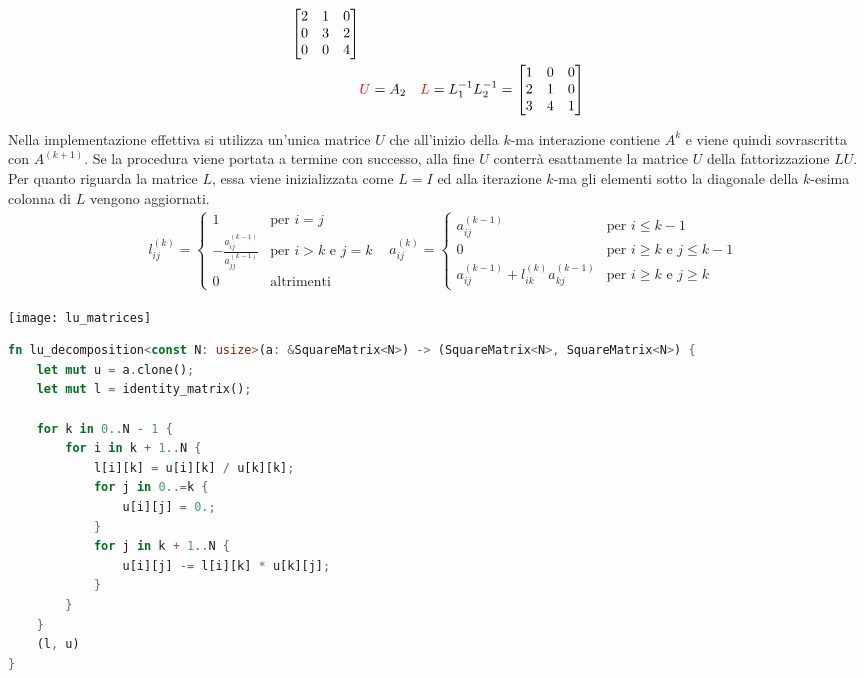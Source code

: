 \documentclass{article}
\begin{document}
\begin{example}
\begin{equation*}
\begin{aligned}
\begin{bmatrix}
               2 & 1 & 0 \\ 
               0 & 3 & 2 \\ 
               0 & 0 & 4
           \end{bmatrix}\\
           & {\color{red}U}=A_2 & {\color{red}L}=L_{1}^{-1}L_{2}^{-1}=\begin{bmatrix}
               1 & 0 & 0 \\ 
               2 & 1 & 0 \\ 
               3 & 4 & 1
           \end{bmatrix}
       \end{aligned} 
    \end{equation*}
\end{example}

Nella implementazione effettiva si utilizza un'unica matrice $U$ che
all'inizio della $k$-ma interazione contiene $A^{k}$ e viene quindi
sovrascritta con $A^{(k+1)}$. Se la procedura viene portata a termine con
successo, alla fine $U$ conterrà esattamente la matrice $U$ della
fattorizzazione $LU$. Per quanto riguarda la matrice $L$, essa viene
inizializzata come $L=I$ ed alla iterazione $k$-ma gli elementi sotto la
diagonale della $k$-esima colonna di $L$ vengono aggiornati.
\begin{equation*}
   \begin{aligned}
       & l_{ij}^{(k)}=\begin{cases}
           1 & \text{per }i=j\\ 
           -\frac{a_{ij}^{(k-1)}}{a_{jj}^{(k-1)}} & \text{per }i>k \text{ e }
           j=k \\ 
           0 & \text{altrimenti}
       \end{cases}
       & a_{ij}^{(k)}=\begin{cases}
           a_{ij}^{(k-1)} & \text{per }i\leq k-1 \\
           0 & \text{per }i\geq k \text{ e }j\leq k-1 \\ 
           a_{ij}^{(k-1)}+l_{ik}^{(k)}a_{kj}^{(k-1)} & \text{per }i\geq k\text{ e }j\geq
           k
       \end{cases}
   \end{aligned} 
\end{equation*}
\begin{center}
    \texttt{[image: lu\_matrices]}
\end{center}
\begin{lstlisting}[language=Rust]
fn lu_decomposition<const N: usize>(a: &SquareMatrix<N>) -> (SquareMatrix<N>, SquareMatrix<N>) {
    let mut u = a.clone();
    let mut l = identity_matrix();

    for k in 0..N - 1 {
        for i in k + 1..N {
            l[i][k] = u[i][k] / u[k][k];
            for j in 0..=k {
                u[i][j] = 0.;
            }
            for j in k + 1..N {
                u[i][j] -= l[i][k] * u[k][j];
            }
        }
    }
    (l, u)
}
\end{lstlisting}
\end{document}
